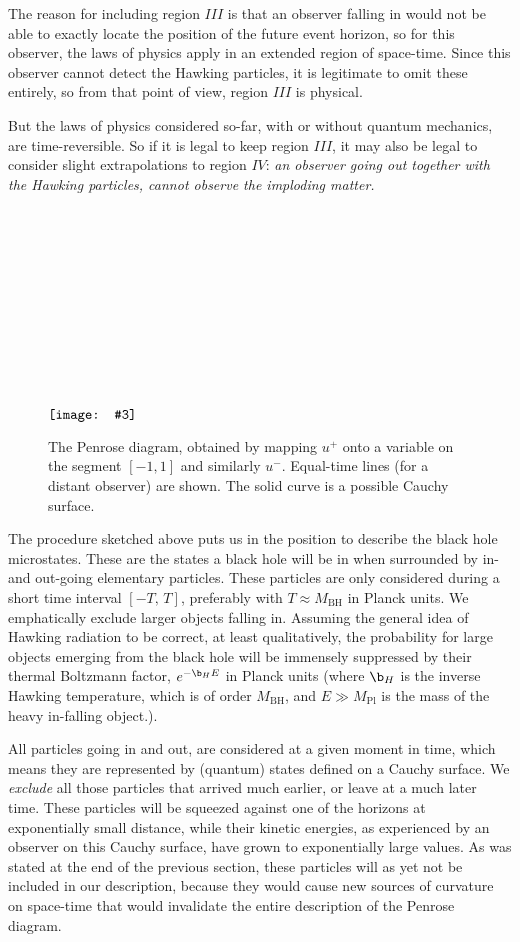 \documentclass[12pt]{article}
\def\lowerwidthfig#1#2#3{\(\raise-#1\hbox{\texttt{[image: \#3]}}\)}
\def\BH{{\mathrm{BH}}}\def\Pl{{\mathrm{Pl}}}\def\inn{{\mathrm{in}}} \def\outt{{\mathrm{out}}}
\begin{document}
The reason for including region \(III\) is that an observer falling in would not be able to exactly locate the position of the future event horizon, so for this observer, the laws of physics apply in an extended region of space-time. Since this observer cannot detect the Hawking particles, it is legitimate to omit these entirely, so from that point of view, region \(III\) is physical.

But the laws of physics considered so-far, with or without quantum mechanics, are time-reversible. So if it is legal to keep region \(III\), it may also be legal to consider slight extrapolations to region \(IV\): \emph{an observer going out together with the Hawking particles, cannot observe the imploding matter.}

\begin{figure} \begin{center}

 \lowerwidthfig{150pt}{250pt}{QmBh_penrosediagr.eps} \quad \begin{caption}
 {\small The Penrose diagram, obtained by mapping \(u^+\) onto a variable 
 on the segment \([-1,1]\) and similarly \(u^-\). Equal-time lines (for a distant observer) are shown. The solid curve is a possible Cauchy surface.} 
 \end{caption} \end{center}
\end{figure}


The procedure sketched above puts us in the position to describe the black hole microstates. These are the states a black hole will be in when surrounded by in- and out-going elementary particles. These particles are only considered during a short time interval \([-T,\,T]\), preferably with \(T\approx M_\BH\)  in Planck units. We emphatically exclude larger objects falling in. Assuming the general idea of Hawking radiation to be correct, at least qualitatively,  the probability for large objects emerging from the black hole will be immensely suppressed by their thermal Boltzmann factor, \(e^{-\b_H E}\) in Planck units (where \(\b_H\) is the inverse Hawking temperature, which is of order \(M_\BH\), and \(E\gg M_\Pl\) is the mass of the heavy in-falling object.).

All particles going in and out, are considered at a given moment in time, which means they are represented by (quantum) states defined on a Cauchy surface. We \emph{exclude} all those particles that arrived much earlier, or leave at a much later time. These particles will be squeezed against one of  the horizons at exponentially small distance, while their kinetic energies, as experienced by an observer on this Cauchy surface, have grown to exponentially large values. As was stated at the end of the previous section, these particles will as yet not be included in our description, because they would cause new sources of curvature on space-time that would invalidate the entire description of the Penrose diagram.
\end{document}
